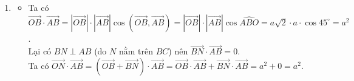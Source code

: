 \begin{vd}
{\begin{enumerate}
\begin{itemize}
\begin{eqnarray*}
				& &=\left|\vec{BI}\right|\cdot\left|\vec{BD}\right|\cos\widehat{DBI} \\
				& &=a\sqrt{2}\cdot a\cdot\cos 135^{\circ}=-a^2.
			\end{eqnarray*}
			\item Ta có $\vec{AD}\cdot \vec{BD}=\left|\vec{AD}\right|\cdot\left|\vec{BD}\right|\cos\left(\vec{AD},\vec{BD}\right)=\left|\vec{AD}\right|\cdot\left|\vec{BD}\right|\cos\widehat{ADB}=a\cdot a\sqrt{2}\cdot\cos 45^{\circ}=a^2$.\\
			Mặt khác $\vec{AD}$ cùng hướng với $\vec{BC}$ nên $\left(\vec{AD},\vec{BC}\right)=0^{\circ}$.\\
			Do đó $\vec{AD}\cdot \vec{BC}=\left|\vec{AD}\right|\cdot\left|\vec{BC}\right|\cos\left(\vec{AD},\vec{BC}\right)=a\cdot a\cdot \cos 0^{\circ}=a^2$.
			\allowdisplaybreaks
			\begin{eqnarray*}
				&\left(\vec{AB}+\vec{AD}\right)\cdot \left(\vec{BD}+\vec{BC}\right) & =\vec{AB} \cdot \vec{BD} + \vec{AB}\cdot \vec{BC}+ \vec{AD}\cdot \vec{BD}+ \vec{AD}\cdot \vec{BC}\\
				& &=-a^2+0+a^2+a^2=a^2.
			\end{eqnarray*}
			\item Ta có
			\allowdisplaybreaks				\begin{eqnarray*}
			&\left(\vec{AB}+\vec{AC}+\vec{AD}\right)\cdot \left(\vec{DA}+\vec{DB}+\vec{DC}\right) & =\left(\vec{AB}+\vec{AD}+\vec{AC}\right)\cdot \left(\vec{DA}+\vec{DC}+\vec{DB}\right)\\
			& &=\left(\vec{AC}+\vec{AC}\right)\cdot \left(\vec{DB}+ \vec{DB}\right)\\
			& &= 2\vec{AC} \cdot 2\vec{DB}\\
			& &= 4\vec{AC} \cdot \vec{DB}\\
			& &=0 \text{ (hai đường chéo hình vuông)}.
			\end{eqnarray*}
		\end{itemize}
		\item \begin{itemize}
		\item Ta có $\vec{OB}\cdot \vec{AB} = \left|\vec{OB}\right|\cdot\left|\vec{AB}\right|\cos\left(\vec{OB},\vec{AB}\right)= \left|\vec{OB}\right|\cdot\left|\vec{AB}\right|\cos \widehat{ABO} = a\sqrt{2}\cdot a\cdot \cos 45^{\circ}=a^2$.\\
		Lại có $BN \perp AB$ (do $N$ nằm trên $BC$) nên $\vec{BN} \cdot \vec{AB} = 0$.\\
		Ta có $\vec{ON} \cdot \vec{AB} = \left(\vec{OB}+\vec{BN}\right)\cdot \vec{AB} = \vec{OB}\cdot \vec{AB}+ \vec{BN} \cdot \vec{AB} = a^2 +0=a^2$.

\end{itemize}
\end{enumerate}}
\end{vd}
